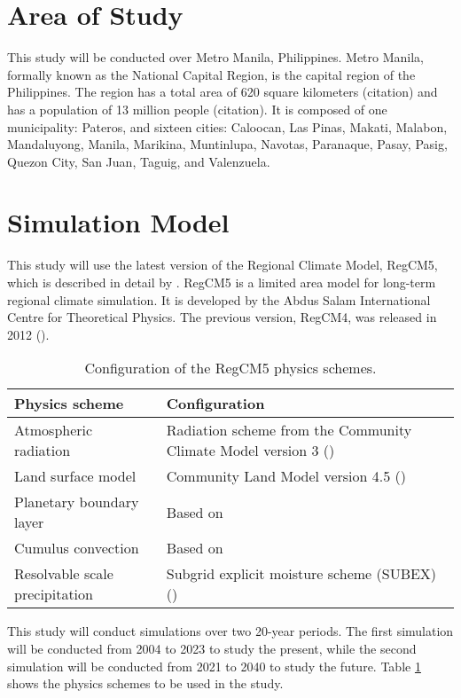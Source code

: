 \section{Area of Study}
	This study will be conducted over Metro Manila, Philippines.
	Metro Manila, formally known as the National Capital Region, is the capital region of the Philippines.
	The region has a total area of 620 square kilometers (citation)
		and has a population of 13 million people (citation).
	It is composed of one municipality: Pateros, and sixteen cities:
		Caloocan,
		Las Pinas,
		Makati,
		Malabon,
		Mandaluyong,
		Manila,
		Marikina,
		Muntinlupa,
		Navotas,
		Paranaque,
		Pasay,
		Pasig,
		Quezon City,
		San Juan,
		Taguig, and
		Valenzuela.
		
\section{Simulation Model}
	This study will use the latest version of the Regional Climate Model, RegCM5, which is described in detail by \textcite{Giorgi2023}.
	RegCM5 is a limited area model for long-term regional climate simulation.
	It is developed by the Abdus Salam International Centre for Theoretical Physics.
	The previous version, RegCM4, was released in 2012 (\cite{Giorgi2012}).
	
	\begin{table}	
		\caption{Configuration of the RegCM5 physics schemes.}
		\label{tab:physics-schemes}
		\centering
		\begin{tabular}{p{2 in} p{2.75 in}}
			\hline \hline
			Physics scheme & Configuration\\
			\hline
			Atmospheric radiation & Radiation scheme from the Community Climate Model version 3 (\cite{Kiehl1996}) \\
			Land surface model & Community Land Model version 4.5 (\cite{Oleson2013})\\
			Planetary boundary layer & Based on \textcite{Holtslag1990}\\
			Cumulus convection & Based on \textcite{Emanuel1991}\\
			Resolvable scale precipitation & Subgrid explicit moisture scheme (SUBEX) (\cite{Pal2000})\\
			\hline
		\end{tabular}		
	\end{table}

	This study will conduct simulations over two 20-year periods.
	The first simulation will be conducted from 2004 to 2023 to study the present,
		while the second simulation will be conducted from 2021 to 2040 to study the future.
	Table \ref{tab:physics-schemes} shows the physics schemes to be used in the study. 
	

